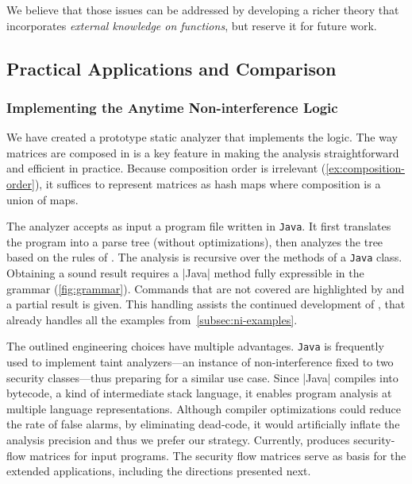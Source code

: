 We believe that those issues can be addressed by developing a richer theory that
incorporates \emph{external knowledge on functions}, but reserve it for future
work.

\subsection{Practical Applications and Comparison}\label{sec:apps}

\subsubsection{Implementing the Anytime Non-interference Logic}\label{sec:analyzer}

We have created a prototype static analyzer \tool that implements the \lname
logic. The way matrices are composed in \lname is a key feature in making the
analysis straightforward and efficient in practice. Because composition order is
irrelevant (\autoref{ex:composition-order}), it suffices to represent matrices
as hash maps where composition is a union of maps.

The \tool analyzer accepts as input a program file written in \texttt{Java}. It
first translates the program into a parse tree (without optimizations), then
analyzes the tree based on the rules of \lname. The analysis is recursive over
the methods of a \texttt{Java} class. Obtaining a sound result requires a
\prc|Java| method fully expressible in the \lname grammar
(\autoref{fig:grammar}). Commands that are not covered are highlighted by \tool
and a partial result is given. This handling assists the continued development
of \lname, that already handles all the examples
from~\autoref{subsec:ni-examples}.

The outlined engineering choices have multiple advantages. \texttt{Java} is
frequently used to implement taint analyzers---an instance of non-interference
fixed to two security classes---thus preparing \tool for a similar use case.
Since \prc|Java| compiles into bytecode, a kind of intermediate stack language,
it enables program analysis at multiple language representations. Although
compiler optimizations could reduce the rate of false alarms, \eg by eliminating
dead-code, it would artificially inflate the analysis precision and thus we
prefer our strategy. Currently, \tool produces security-flow matrices for input
programs. The security flow matrices serve as basis for the extended
applications, including the directions presented next.

